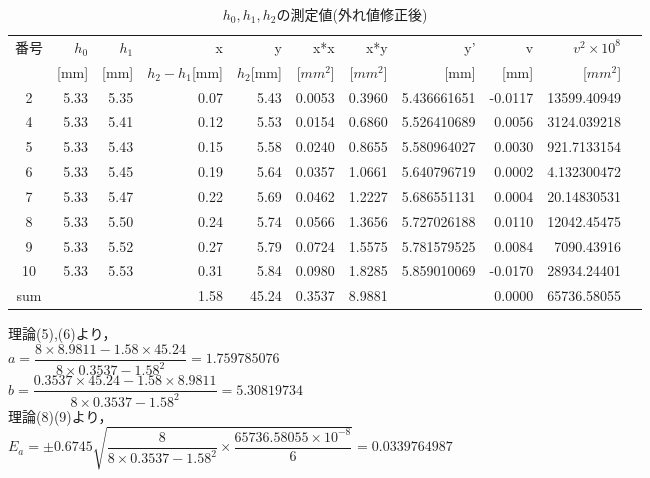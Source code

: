 \documentclass[a4paper,1pt]{jsarticle}
\begin{document}
\begin{table}[H]
  \caption{$h_0,h_1,h_2$の測定値(外れ値修正後)}
  \label{table:SpeedOfLight}
  \centering
  \begin{tabular}{|c||r|r|r|r|r|r|r|r|r|r|}
    \hline
    番号 & $h_0$ & $h_1$ & x & y & x*x & x*y & y' & v & $v^2\times10^8$\\
    &[mm] & [mm] & $h_2-h_1$[mm] & $h_2$[mm] & [$mm^2$] & [$mm^2$] & [mm] & [mm] & [$mm^2$]\\
    \hline \hline
    2 & 5.33 & 5.35 & 0.07 & 5.43 & 0.0053 & 0.3960 & 5.436661651 & -0.0117 & 13599.40949 \\
    4 & 5.33 & 5.41 & 0.12 & 5.53 & 0.0154 & 0.6860 & 5.526410689 & 0.0056 & 3124.039218 \\
    5 & 5.33 & 5.43 & 0.15 & 5.58 & 0.0240 & 0.8655 & 5.580964027 & 0.0030 & 921.7133154 \\
    6 & 5.33 & 5.45 & 0.19 & 5.64 & 0.0357 & 1.0661 & 5.640796719 & 0.0002 & 4.132300472 \\
    7 & 5.33 & 5.47 & 0.22 & 5.69 & 0.0462 & 1.2227 & 5.686551131 & 0.0004 & 20.14830531 \\
    8 & 5.33 & 5.50 & 0.24 & 5.74 & 0.0566 & 1.3656 & 5.727026188 & 0.0110 & 12042.45475 \\
    9 & 5.33 & 5.52 & 0.27 & 5.79 & 0.0724 & 1.5575 & 5.781579525 & 0.0084 & 7090.43916 \\
    10 & 5.33 & 5.53 & 0.31 & 5.84 & 0.0980 & 1.8285 & 5.859010069 & -0.0170 & 28934.24401 \\

   \hline
   sum &  &  & 1.58 & 45.24 & 0.3537 & 8.9881 &  & 0.0000 & 65736.58055 \\
    \hline
  \end{tabular}


\end{table}


\clearpage


理論(5),(6)より，\\

$a=\dfrac{8\times8.9811-1.58\times45.24}{8\times0.3537-1.58^2}=1.759785076$\\

$b=\dfrac{0.3537\times45.24-1.58\times8.9811}{8\times0.3537-1.58^2}=5.30819734$\\

理論(8)(9)より，\\

$E_a=\pm0.6745\sqrt{\dfrac{8}{8\times0.3537-1.58^2}\times\dfrac{65736.58055\times10^{-8}}{6}}=0.0339764987$\\
\end{document}
